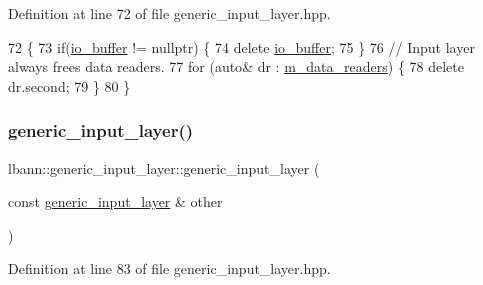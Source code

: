 Definition at line 72 of file generic\+\_\+input\+\_\+layer.\+hpp.


\begin{DoxyCode}
72                                   \{
73     \textcolor{keywordflow}{if}(\hyperlink{classlbann_1_1generic__input__layer_a9dfe8b9afaebc7a5bcb0177ee2ab428f}{io\_buffer} != \textcolor{keyword}{nullptr}) \{
74       \textcolor{keyword}{delete} \hyperlink{classlbann_1_1generic__input__layer_a9dfe8b9afaebc7a5bcb0177ee2ab428f}{io\_buffer};
75     \}
76     \textcolor{comment}{// Input layer always frees data readers.}
77     \textcolor{keywordflow}{for} (\textcolor{keyword}{auto}& dr : \hyperlink{classlbann_1_1generic__input__layer_a6bc18860c02beed0252ea3cc87bc48d2}{m\_data\_readers}) \{
78       \textcolor{keyword}{delete} dr.second;
79     \}
80   \}
\end{DoxyCode}
\mbox{\label{classlbann_1_1generic__input__layer_a5447106074487e60d69add9cab511319}} 
\subsubsection{\texorpdfstring{generic\+\_\+input\+\_\+layer()}{generic\_input\_layer()}\hspace{0.1cm}{\footnotesize\ttfamily [2/2]}}
{\footnotesize\ttfamily lbann\+::generic\+\_\+input\+\_\+layer\+::generic\+\_\+input\+\_\+layer (\begin{DoxyParamCaption}\item[{const \hyperlink{classlbann_1_1generic__input__layer}{generic\+\_\+input\+\_\+layer} \&}]{other }\end{DoxyParamCaption})\hspace{0.3cm}{\ttfamily [inline]}}



Definition at line 83 of file generic\+\_\+input\+\_\+layer.\+hpp.


